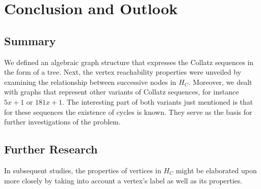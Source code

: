 \chapter{Conclusion and Outlook}

\section{Summary}
We defined an algebraic graph structure that expresses the Collatz sequences in the form of a tree. Next, the vertex reachability properties were unveiled by examining the relationship between successive nodes in $H_C$. Moreover, we dealt with graphs that represent other variants of Collatz sequences, for instance $5x+1$ or $181x+1$. The interesting part of both variants just mentioned is that for these sequences the existence of cycles is known. They serve as the basis for further investigations of the problem.

\section{Further Research}
In subsequent studies, the properties of vertices in $H_C$ might be elaborated upon more closely by taking into account a vertex's label as well as its properties.